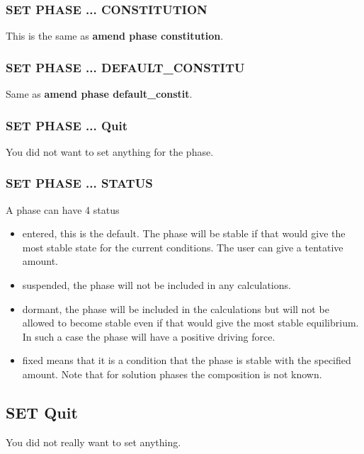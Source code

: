 \documentclass[12pt]{article}
\begin{document}
\subsubsection{SET PHASE ... CONSTITUTION}

This is the same as {\bf amend phase constitution}.

\subsubsection{SET PHASE ... DEFAULT\_CONSTITU}

Same as {\bf amend phase default\_constit}.

\subsubsection{SET PHASE ... Quit}

You did not want to set anything for the phase.

\subsubsection{SET PHASE ... STATUS}

A phase can have 4 status

\begin{itemize}
\item entered, this is the default.  The phase will be stable if that
would give the most stable state for the current conditions.  The user
can give a tentative amount.
\item suspended, the phase will not be included in any calculations.
\item dormant, the phase will be included in the calculations but will
not be allowed to become stable even if that would give the most
stable equilibrium.  In such a case the phase will have a positive
driving force.
\item fixed means that it is a condition that the phase is stable with
the specified amount.  Note that for solution phases the composition
is not known.
\end{itemize}

\subsection{SET Quit}

You did not really want to set anything.
\end{document}

